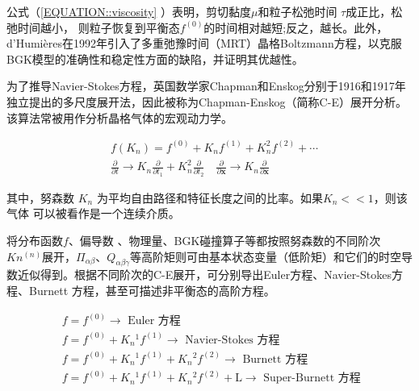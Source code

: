 \documentclass[LBMDerivation.tex]{subfiles}
\begin{document}
公式（\ref{EQUATION::viscosity} ）表明，剪切黏度$\mu$和粒子松弛时间 $\tau$成正比，松弛时间越小， 则粒子恢复到平衡态$f^{(0)}$的时间相对越短;反之，越长。此外，d’Humières在1992年引入了多重弛豫时间（MRT）晶格Boltzmann方程，以克服BGK模型的准确性和稳定性方面的缺陷，并证明其优越性。




为了推导Navier-Stokes方程，英国数学家Chapman和Enskog分别于1916和1917年独立提出的多尺度展开法，因此被称为Chapman-Enskog（简称C-E）展开分析。该算法常被用作分析晶格气体的宏观动力学。

\begin{equation}
  \begin{aligned}
     & f\left(K_{n}\right)=f^{(0)}+K_{n} f^{(1)}+K_{n}^{2} f^{(2)}+\cdots                                                                                                                                                                \\
     & \frac{\partial}{\partial t} \rightarrow K_{n} \frac{\partial}{\partial t_{1}}+K_{n}^{2} \frac{\partial}{\partial t_{2}} \quad \frac{\partial}{\partial \boldsymbol{x}} \rightarrow K_{n} \frac{\partial}{\partial \boldsymbol{x}}
  \end{aligned}
\end{equation}

其中，努森数 $K_n$ 为平均自由路径和特征长度之间的比率。如果$K_n<<1$，则该气体 可以被看作是一个连续介质。


将分布函数$f$、偏导数 、物理量、BGK碰撞算子等都按照努森数的不同阶次$Kn^{(n)}$展开，$\Pi_{\alpha \beta}$、$Q_{\alpha \beta \gamma}$等高阶矩则可由基本状态变量（低阶矩）和它们的时空导数近似得到。根据不同阶次的C-E展开，可分别导出Euler方程、Navier-Stokes方程、Burnett 方程，甚至可描述非平衡态的高阶方程。

\begin{equation}
  \boxed{
    \begin{aligned}
       & f=f^{(0)} \longrightarrow \text { Euler 方程 }                                                              \\
       & f=f^{(0)}+K_{n}{ }^{1} f^{(1)} \longrightarrow \text { Navier-Stokes 方程 }                                 \\
       & f=f^{(0)}+K_{n}{ }^{1} f^{(1)}+K_{n}{ }^{2} f^{(2)} \longrightarrow \text { Burnett 方程 }                  \\
       & f=f^{(0)}+K_{n}{ }^{1} f^{(1)}+K_{n}{ }^{2} f^{(2)}+\mathrm{L} \longrightarrow \text { Super-Burnett 方程 }
    \end{aligned}
  }
  \label{EQUATION::CE EXPANDING} ~
\end{equation}
\end{document}
